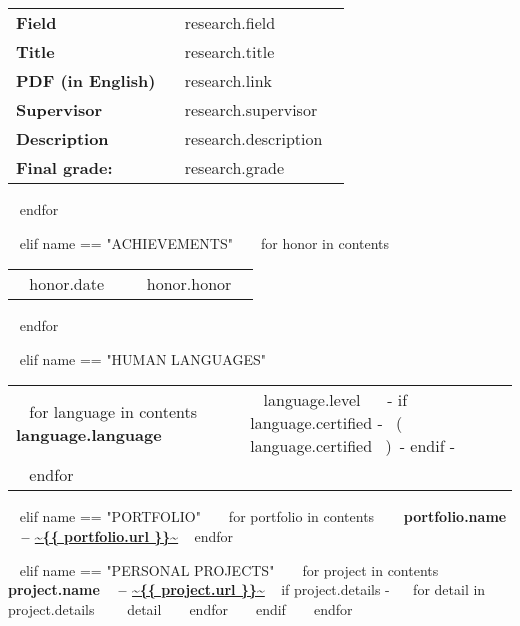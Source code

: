\begin{minipage}{\textwidth}
\begin{tabular}{ @{} p{32mm} p{135mm} @{} }
    \small \bf Field & \small ~{{ research.field }}~ \\
    \small \bf Title & \small ~{{ research.title }}~ \\
    \small \bf PDF (in English) & \small ~{{ research.link }}~ \\
    \small \bf Supervisor & \small ~{{ research.supervisor }}~ \\
    \small \bf Description & \small ~{{ research.description }}~ \\
    \small \bf \small \color{maingrey} Final grade: & \small \color{maingrey} ~{{ research.grade }}~ \\
    
    \end{tabular}
    \vspace{1mm}
  ~{ endfor }~
  \vspace{4mm}

~{ elif name == "ACHIEVEMENTS" }~
  ~{ for honor in contents }~
    \begin{tabular}{ @{} p{32mm} p{135mm} @{} }
    {~{{ honor.date }}~} & {\small ~{{ honor.honor }}~}
    \end{tabular}
    \vspace{1mm}
  ~{ endfor }~

~{ elif name == "HUMAN LANGUAGES" }~
  \begin{tabular}{ @{} p{32mm} p{135mm} @{} }
  ~{ for language in contents }~
    \bf {~{{ language.language }}~} & {\small ~{{ language.level }}~ ~{- if language.certified -}~ \small\color{maingrey}\hspace{1mm}(~{{ language.certified }}~)~{- endif -}~} \\
  ~{ endfor }~
  \end{tabular}
  \vspace{2mm}

~{ elif name == "PORTFOLIO" }~
  ~{ for portfolio in contents }~
    {\bf ~{{ portfolio.name }}~ -- \color{maincolor}\url{~{{ portfolio.url }}~} }
    \vspace{1mm}
  ~{ endfor }~

~{ elif name == "PERSONAL PROJECTS" }~
  ~{ for project in contents }~
    {\small\bf ~{{ project.name }}~ -- \color{maincolor}\url{~{{ project.url }}~} }
    \vspace{1mm}
    ~{ if project.details -}~
    ~{ for detail in project.details }~
      $ $ \small ~{{ detail }}~
    ~{ endfor }~
    ~{ endif }~
    \vspace{3mm}
  ~{ endfor }~
  \vspace{15mm}



\end{minipage}
